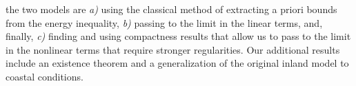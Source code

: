 \documentclass[twoside]{article}
\begin{document}
the two models are \textit{a)} using the classical method of extracting a priori bounds from the energy inequality, \textit{b)} passing to the limit in the linear terms, and, finally, \textit{c)} finding and using compactness results that allow us to pass to the limit in the nonlinear terms that require stronger regularities. Our additional results include an existence theorem and a generalization of the original inland model to coastal conditions.



\bigskip


\medskip

\end{document}
